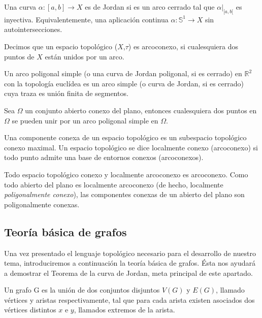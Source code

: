 \begin{definition}
	Una curva $\alpha : [a,b] \rightarrow X$ es de Jordan si es un arco cerrado tal que $\alpha \vert_{[a,b[}$ es inyectiva. Equivalentemente, una aplicación continua $\alpha : \mathbb{S}^1 \rightarrow X$ sin autointersecciones.
\end{definition}

\begin{definition}
	Decimos que un espacio topológico ($X$,$\tau$) es arcoconexo, si cualesquiera dos puntos de $X$ están unidos por un arco.
\end{definition}

\begin{definition}
	Un arco poligonal simple (o una curva de Jordan poligonal, si es cerrado) en $\mathbb{R}^2$ con la topología euclídea es un arco simple (o curva de Jordan, si es cerrado) cuya traza es  unión finita de segmentos.
\end{definition}

\begin{lemma}
	Sea $\Omega$ un conjunto abierto conexo del plano, entonces cualesquiera dos puntos en $\Omega$ se pueden unir por un arco poligonal simple en $\Omega$. 
\end{lemma}

\begin{definition}
	Una componente conexa de un espacio topológico es un subespacio topológico conexo maximal. Un espacio topológico se dice localmente conexo (arcoconexo) si todo punto admite una base de entornos conexos (arcoconexos). 
\end{definition}
\begin{lemma}
Todo espacio topológico conexo y localmente arcoconexo es arcoconexo. Como todo abierto del plano es localmente arcoconexo (de hecho, localmente {\em poligonalmente conexo}), las componentes conexas de un abierto del plano son poligonalmente conexas. 
\end{lemma}

\subsection{Teoría básica de grafos}

Una vez presentado el lenguaje topológico necesario para el desarrollo de nuestro tema, introduciremos a continuación la teoría básica de grafos. Ésta nos ayudará a demostrar el Teorema de la curva de Jordan, meta principal de este apartado.

\begin{definition}
	Un grafo G es la unión de dos conjuntos disjuntos $V(G)$ y $E(G)$, llamado vértices y aristas respectivamente, tal que para cada arista existen asociados dos vértices distintos $x$ e $y$, llamados extremos de la arista.
\end{definition}



